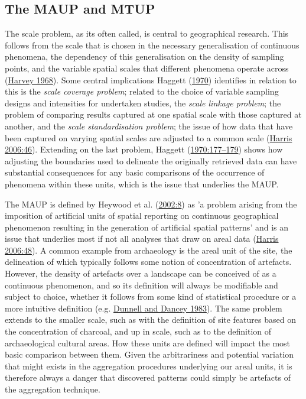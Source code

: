 \documentclass[
  12pt,
  a4paper,
  oneside]{book}
\begin{document}
\hypertarget{the-maup-and-mtup}{%
\subsection{The MAUP and MTUP}\label{the-maup-and-mtup}}

The scale problem, as its often called, is central to geographical research. This follows from the scale that is chosen in the necessary generalisation of continuous phenomena, the dependency of this generalisation on the density of sampling points, and the variable spatial scales that different phenomena operate across (\protect\hyperlink{ref-harvey1968}{Harvey 1968}). Some central implications Haggett (\protect\hyperlink{ref-haggett1970}{1970}) identifies in relation to this is the \emph{scale coverage problem}; related to the choice of variable sampling designs and intensities for undertaken studies, the \emph{scale linkage problem}; the problem of comparing results captured at one spatial scale with those captured at another, and the \emph{scale standardisation problem}; the issue of how data that have been captured on varying spatial scales are adjusted to a common scale (\protect\hyperlink{ref-harris2006}{Harris 2006:46}). Extending on the last problem, Haggett (\protect\hyperlink{ref-haggett1970}{1970:177--179}) shows how adjusting the boundaries used to delineate the originally retrieved data can have substantial consequences for any basic comparisons of the occurrence of phenomena within these units, which is the issue that underlies the MAUP.

The MAUP is defined by Heywood et al. (\protect\hyperlink{ref-heywood2002}{2002:8}) as 'a problem arising from the imposition of artificial units of spatial reporting on continuous geographical phenomenon resulting in the generation of artificial spatial patterns' and is an issue that underlies most if not all analyses that draw on areal data (\protect\hyperlink{ref-harris2006}{Harris 2006:48}). A common example from archaeology is the areal unit of the site, the delineation of which typically follows some notion of concentration of artefacts. However, the density of artefacts over a landscape can be conceived of as a continuous phenomenon, and so its definition will always be modifiable and subject to choice, whether it follows from some kind of statistical procedure or a more intuitive definition (e.g. \protect\hyperlink{ref-dunnell1983}{Dunnell and Dancey 1983}). The same problem extends to the smaller scale, such as with the definition of site features based on the concentration of charcoal, and up in scale, such as to the definition of archaeological cultural areas. How these units are defined will impact the most basic comparison between them. Given the arbitrariness and potential variation that might exists in the aggregation procedures underlying our areal units, it is therefore always a danger that discovered patterns could simply be artefacts of the aggregation technique.
\end{document}
